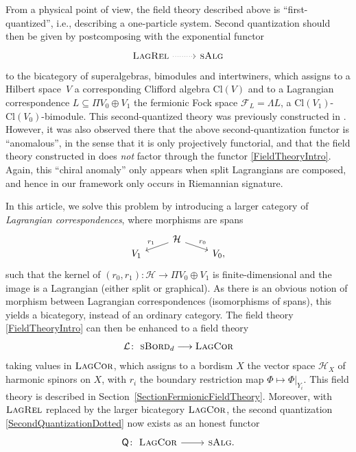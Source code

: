 \documentclass[10pt,a4paper]{amsart}
\numberwithin{equation}{section}
\newcommand{\LagRel}{\textsc{LagRel}}
\newcommand{\LagCor}{\textsc{LagCor}}
\newcommand{\Cl}{\mathrm{Cl}}
\newcommand{\sBord}{\textsc{sBord}}
\begin{document}
From a physical point of view, the field theory described above is ``first-quantized'', i.e., describing a one-particle system.
Second quantization should then be given by postcomposing with the exponential functor
\begin{equation}
\label{SecondQuantizationDotted}
\begin{tikzcd}
 \LagRel \ar[r, dotted] & \textsc{sAlg}
\end{tikzcd}
\end{equation}
to the bicategory of superalgebras, bimodules and intertwiners,
which assigns to a Hilbert space~$V$ a corresponding Clifford algebra $\Cl(V)$ and to a Lagrangian correspondence ${L\! \subseteq\! \Pi V_0 \!\oplus\! V_1}$ the fermionic Fock space $\mathcal{F}_L = \Lambda L$, a $\Cl(V_1)$-$\Cl(V_0)$-bimodule.
This second-quantized theory was previously constructed in \cite{LudewigRoos}.
However, it was also observed there that the above second-quantization functor is ``anomalous'', in the sense that it is only projectively functorial, and that the field theory constructed in \cite{LudewigRoos} does \emph{not} factor through the functor \eqref{FieldTheoryIntro}.
Again, this ``chiral anomaly'' only appears when split Lagrangians are composed, and hence in our framework only occurs in Riemannian signature.

In this article, we solve this problem by introducing a larger category of \emph{Lagrangian correspondences}, where morphisms are spans
\begin{equation*}
\begin{tikzcd}[row sep = 0.2mm]
 & \mathcal{H} \ar[dl, "r_1"'] \ar[dr, "r_0"] &\\
 V_1 & & V_0,
\end{tikzcd}
\end{equation*}
such that the kernel of $(r_0, r_1)\colon \mathcal{H} \to \Pi V_0 \oplus V_1$ is finite-dimensional and the image is a Lagrangian (either split or graphical).
As there is an obvious notion of morphism between Lagrangian correspondences (isomorphisms of spans), this yields a bicategory, instead of an ordinary category.
The field theory \eqref{FieldTheoryIntro} can then be enhanced to a field theory
\begin{equation}
\label{FTEnhancementIntro}
 \mathcal{L} \colon\ \sBord_d \longrightarrow \LagCor
\end{equation}
taking values in $\LagCor$, which assigns to a bordism $X$ the vector space $\mathcal{H}_X$ of harmonic spinors on $X$, with $r_i$ the boundary restriction map $\Phi \mapsto \Phi|_{Y_i}$.
This field theory is described in Section~\ref{SectionFermionicFieldTheory}.
Moreover, with $\LagRel$ replaced by the larger bicategory $\LagCor$, the second quantization \eqref{SecondQuantizationDotted} now exists as an honest functor
\begin{equation*}
\begin{tikzcd}
 \textsf{Q}\colon\ \LagCor \ar[r] & \textsc{sAlg}.
\end{tikzcd}
\end{equation*}
\end{document}
